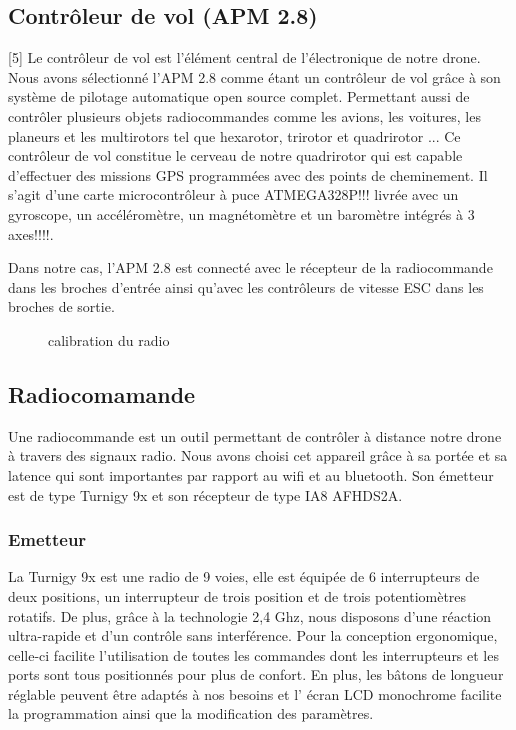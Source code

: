 	\subsection {Contrôleur de vol (APM 2.8)}[5]
	Le contrôleur de vol est l'élément central de l'électronique de notre drone.
	Nous avons sélectionné l’APM 2.8 comme étant un contrôleur de vol grâce à son système de pilotage automatique open source complet. Permettant aussi de contrôler plusieurs objets radiocommandes comme les avions, les voitures, les planeurs et les multirotors tel que hexarotor, trirotor et quadrirotor ...
	Ce contrôleur de vol constitue le cerveau de notre quadrirotor qui est capable d'effectuer des missions GPS programmées avec des points de cheminement. Il s’agit d’une carte microcontrôleur à puce ATMEGA328P!!! livrée avec un gyroscope, un accéléromètre, un magnétomètre et un baromètre intégrés à 3 axes!!!!.
	
	Dans notre cas, l’APM 2.8 est connecté avec le récepteur de la radiocommande dans les broches d’entrée ainsi qu'avec les contrôleurs de vitesse ESC dans les broches de sortie. 
	
	\begin{figure} [h]
		\begin{center}
			\centering
		\end{center}
		\caption{calibration du radio}
	\end{figure}
	\newpage
	\subsection {Radiocomamande}
	Une radiocommande est un outil permettant de contrôler à distance notre drone à travers des signaux radio. Nous avons choisi cet appareil grâce à sa portée et sa latence qui sont importantes par rapport au wifi et au bluetooth. Son émetteur est de type Turnigy 9x et son récepteur de type IA8 AFHDS2A.
	
	\subsubsection{Emetteur} 
	La Turnigy 9x est une radio de 9 voies, elle est équipée de 6 interrupteurs de deux positions, un interrupteur de trois position et de trois potentiomètres rotatifs.
	De plus, grâce à la technologie 2,4 Ghz, nous disposons d'une réaction ultra-rapide et d'un contrôle sans interférence. Pour la
	conception ergonomique, celle-ci facilite l'utilisation de toutes les commandes dont les interrupteurs et les ports sont tous positionnés pour plus de confort. En plus, les bâtons de longueur réglable peuvent être adaptés à nos besoins et l' écran LCD monochrome facilite la programmation ainsi que la modification des paramètres. 
	

